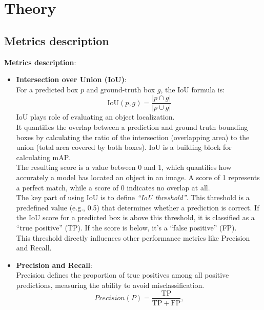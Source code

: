 \documentclass[12pt,a4paper]{report}
\newcommand{\TP}{\mathrm{TP}}
\newcommand{\FP}{\mathrm{FP}}
\newcommand{\IoU}{\mathrm{IoU}}
\begin{document}
\chapter{Theory}
\label{chap:literature}
\section*{Metrics description}
\textbf{Metrics description}:

\begin{itemize}[leftmargin=1.5em]
    \item \textbf{Intersection over Union (IoU)}: \\
            For a predicted box \(p\) and ground-truth box \(g\), the IoU formula is: \\
            \[
                \IoU(p,g) = \frac{|p\cap g|}{|p\cup g|}
            \]
            IoU plays role of evaluating an object localization. \\
            It quantifies the overlap between a prediction and ground truth bounding boxes by calculating
            the ratio of the intersection (overlapping area) to the union (total area covered by both boxes).
            IoU is a building block for calculating mAP. \\
            The resulting score is a value between 0 and 1, which quantifies how accurately a model has located an
            object in an image. A score of 1 represents a perfect match, while a score of 0 indicates no
            overlap at all. \\
            The key part of using IoU is to define \textit{\enquote{IoU threshold}}. This threshold is a predefined value
            (e.g., 0.5) that determines whether a prediction is correct. If the IoU score for a predicted box is
            above this threshold, it is classified as a \enquote{true positive} (TP).
            If the score is below, it's a \enquote{false positive} (FP). \\
            This threshold directly influences other performance metrics like Precision and Recall. \\

    \item \textbf{Precision and Recall}: \\
            Precision defines the proportion of true positives among all positive predictions,
            measuring the ability to avoid misclassification. \\
            \[
                Precision (P) = \frac{\TP}{\TP+\FP},
            \]


\end{itemize}
\end{document}
